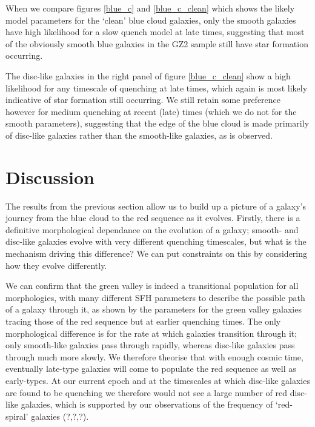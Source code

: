 \documentclass{mn2e}
\begin{document}
When we compare figures \ref{blue_c} and \ref{blue_c_clean} which shows the likely model parameters for the `clean' blue cloud galaxies, only the smooth galaxies have high likelihood for a slow quench model at late times, suggesting that most of the obviously smooth blue galaxies in the GZ2 sample still have star formation occurring. 

The disc-like galaxies in the right panel of figure \ref{blue_c_clean} show a high likelihood for any timescale of quenching at late times, which again is most likely indicative of star formation still occurring. We still retain some preference however for medium quenching at recent (late) times (which we do not for the smooth parameters), suggesting that the edge of the blue cloud is made primarily of disc-like galaxies rather than the smooth-like galaxies, as is observed.


\section{Discussion}\label{diss}
The results from the previous section allow us to build up a picture of a galaxy's journey from the blue cloud to the red sequence as it evolves. Firstly, there is a definitive morphological dependance on the evolution of a galaxy; smooth- and disc-like galaxies evolve with very different quenching timescales, but what is the mechanism driving this difference? We can put constraints on this by considering how they evolve differently.

We can confirm that the green valley is indeed a transitional population for all morphologies, with many different SFH parameters to describe the possible path of a galaxy through it, as shown by the parameters for the green valley galaxies tracing those of the red sequence but at earlier quenching times. The only morphological difference is for the rate at which galaxies transition through it; only smooth-like galaxies pass through rapidly, whereas disc-like galaxies pass through much more slowly. We therefore theorise that with enough cosmic time, eventually late-type galaxies will come to populate the red sequence as well as early-types. At our current epoch and at the timescales at which disc-like galaxies are found to be quenching we therefore would not see a large number of red disc-like galaxies, which is supported by our observations of the frequency of `red-spiral' galaxies (?,?,?).
\end{document}
